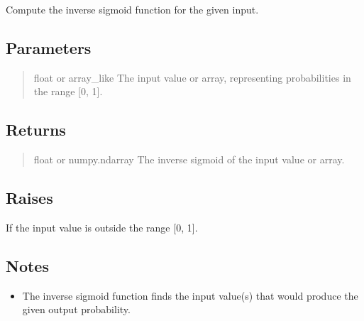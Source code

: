 \documentclass[a4paper,11pt,openany,english]{sphinxmanual}
\begin{document}
\begin{fulllineitems}
\label{\detokenize{api_misc:xtremes.miscellaneous.invsigmoid}}
\pysigstartsignatures
{}
\pysigstopsignatures
\sphinxAtStartPar
Compute the inverse sigmoid function for the given input.


\subsection{Parameters}
\label{\detokenize{api_misc:id1}}\begin{quote}\begin{description}
\sphinxAtStartPar
float or array\_like
The input value or array, representing probabilities in the range {[}0, 1{]}.

\end{description}\end{quote}


\subsection{Returns}
\label{\detokenize{api_misc:id2}}\begin{quote}\begin{description}
\sphinxAtStartPar
float or numpy.ndarray
The inverse sigmoid of the input value or array.

\end{description}\end{quote}


\subsection{Raises}
\label{\detokenize{api_misc:raises}}\begin{description}
\sphinxAtStartPar
If the input value is outside the range {[}0, 1{]}.

\end{description}


\subsection{Notes}
\label{\detokenize{api_misc:id3}}\begin{itemize}
\item {} 
\sphinxAtStartPar
The inverse sigmoid function finds the input value(s) that would produce the given output probability.


\end{itemize}
\end{fulllineitems}
\end{document}
